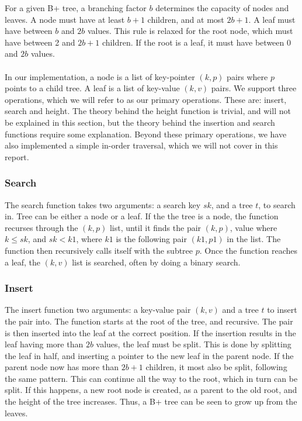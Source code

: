 For a given B+ tree, a branching factor $b$ determines the capacity of nodes and leaves. A node must have at least $b+1$ children, and at most $2b+1$. A leaf must have between $b$ and $2b$ values. This rule is relaxed for the root node, which must have between 2 and $2b+1$ children. If the root is a leaf, it must have between 0 and $2b$ values.

\paragraph{}
In our implementation, a node is a list of key-pointer $(k, p)$ pairs where $p$ points to a child tree. A leaf is a list of key-value $(k, v)$ pairs. We support three operations, which we will refer to as our primary operations. These are: insert, search and height. The theory behind the height function is trivial, and will not be explained in this section, but the theory behind the insertion and search functions require some explanation. Beyond these primary operations, we have also implemented a simple in-order traversal, which we will not cover in this report.

\subsubsection{Search}
The search function takes two arguments: a search key $sk$, and a tree $t$, to search in. Tree can be either a node or a leaf. If the the tree is a node, the function recurses through the $(k, p)$ list, until it finds the pair $(k, p)$, value where $k \le sk$, and $sk < k1$, where $k1$ is the following pair $(k1, p1)$ in the list. The function then recursively calls itself with the subtree $p$. Once the function reaches a leaf, the $(k, v)$ list is searched, often by doing a binary search.

\subsubsection{Insert}
The insert function two arguments: a key-value pair $(k, v)$ and a tree $t$ to insert the pair into. The function starts at the root of the tree, and recursive. The pair is then inserted into the leaf at the correct position. If the insertion results in the leaf having more than $2b$ values, the leaf must be split. This is done by splitting the leaf in half, and inserting a pointer to the new leaf in the parent node. If the parent node now has more than $2b+1$ children, it most also be split, following the same pattern. This can continue all the way to the root, which in turn can be split. If this happens, a new root node is created, as a parent to the old root, and the height of the tree increases. Thus, a B+ tree can be seen to grow up from the leaves.
